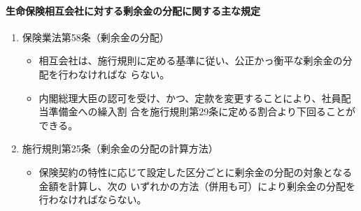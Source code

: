 \documentclass[report,gutter=10mm,fore-edge=10mm,uplatex,dvipdfmx]{jlreq}
\begin{document}
\paragraph{生命保険相互会社に対する剰余金の分配に関する主な規定}

\begin{enumerate} [＊]
\item 保険業法第58条（剰余金の分配）
\begin{itemize}
 \item 相互会社は、施行規則に定める基準に従い、公正かっ衡平な剰余金の分配を行わなければな
 らない。
\item 内閣総理大臣の認可を受け、かつ、定款を変更することにより、社員配当準備金への繰入割
 合を施行規則第29条に定める割合より下回ることができる。
\end{itemize}
\item 施行規則第25条（剰余金の分配の計算方法）
\begin{itemize}
 \item 保険契約の特性に応じて設定した区分ごとに剰余金の分配の対象となる金額を計算し、次の
 いずれかの方法（併用も可）により剰余金の分配を行わなければならない。


\end{itemize}
\end{enumerate}
\end{document}
